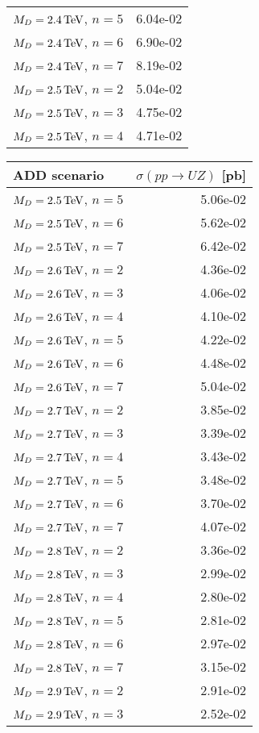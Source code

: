 \begin{table}[hbtp]
\begin{center}
{\begin{tabular}{lr}
$M_{D} = 2.4 \,\text{Te\hspace{-.08em}V}$, $n=5$  & 6.04e-02 \\
$M_{D} = 2.4 \,\text{Te\hspace{-.08em}V}$, $n=6$  & 6.90e-02 \\
$M_{D} = 2.4 \,\text{Te\hspace{-.08em}V}$, $n=7$  & 8.19e-02 \\
$M_{D} = 2.5 \,\text{Te\hspace{-.08em}V}$, $n=2$  & 5.04e-02 \\
$M_{D} = 2.5 \,\text{Te\hspace{-.08em}V}$, $n=3$  & 4.75e-02 \\
$M_{D} = 2.5 \,\text{Te\hspace{-.08em}V}$, $n=4$  & 4.71e-02 \\\hline
  \end{tabular}
  \quad \quad
  \begin{tabular}{lr}
\hline 
ADD scenario              & $\sigma(pp\rightarrow UZ)$ [pb]\\
\hline
$M_{D} = 2.5 \,\text{Te\hspace{-.08em}V}$, $n=5$  & 5.06e-02 \\
$M_{D} = 2.5 \,\text{Te\hspace{-.08em}V}$, $n=6$  & 5.62e-02 \\
$M_{D} = 2.5 \,\text{Te\hspace{-.08em}V}$, $n=7$  & 6.42e-02 \\
$M_{D} = 2.6 \,\text{Te\hspace{-.08em}V}$, $n=2$  & 4.36e-02 \\
$M_{D} = 2.6 \,\text{Te\hspace{-.08em}V}$, $n=3$  & 4.06e-02 \\
$M_{D} = 2.6 \,\text{Te\hspace{-.08em}V}$, $n=4$  & 4.10e-02 \\
$M_{D} = 2.6 \,\text{Te\hspace{-.08em}V}$, $n=5$  & 4.22e-02 \\
$M_{D} = 2.6 \,\text{Te\hspace{-.08em}V}$, $n=6$  & 4.48e-02 \\
$M_{D} = 2.6 \,\text{Te\hspace{-.08em}V}$, $n=7$  & 5.04e-02 \\
$M_{D} = 2.7 \,\text{Te\hspace{-.08em}V}$, $n=2$  & 3.85e-02 \\
$M_{D} = 2.7 \,\text{Te\hspace{-.08em}V}$, $n=3$  & 3.39e-02 \\
$M_{D} = 2.7 \,\text{Te\hspace{-.08em}V}$, $n=4$  & 3.43e-02 \\
$M_{D} = 2.7 \,\text{Te\hspace{-.08em}V}$, $n=5$  & 3.48e-02 \\
$M_{D} = 2.7 \,\text{Te\hspace{-.08em}V}$, $n=6$  & 3.70e-02 \\
$M_{D} = 2.7 \,\text{Te\hspace{-.08em}V}$, $n=7$  & 4.07e-02 \\
$M_{D} = 2.8 \,\text{Te\hspace{-.08em}V}$, $n=2$  & 3.36e-02 \\
$M_{D} = 2.8 \,\text{Te\hspace{-.08em}V}$, $n=3$  & 2.99e-02 \\
$M_{D} = 2.8 \,\text{Te\hspace{-.08em}V}$, $n=4$  & 2.80e-02 \\
$M_{D} = 2.8 \,\text{Te\hspace{-.08em}V}$, $n=5$  & 2.81e-02 \\
$M_{D} = 2.8 \,\text{Te\hspace{-.08em}V}$, $n=6$  & 2.97e-02 \\
$M_{D} = 2.8 \,\text{Te\hspace{-.08em}V}$, $n=7$  & 3.15e-02 \\
$M_{D} = 2.9 \,\text{Te\hspace{-.08em}V}$, $n=2$  & 2.91e-02 \\
$M_{D} = 2.9 \,\text{Te\hspace{-.08em}V}$, $n=3$  & 2.52e-02 \\

\end{tabular}}
\end{center}
\end{table}
